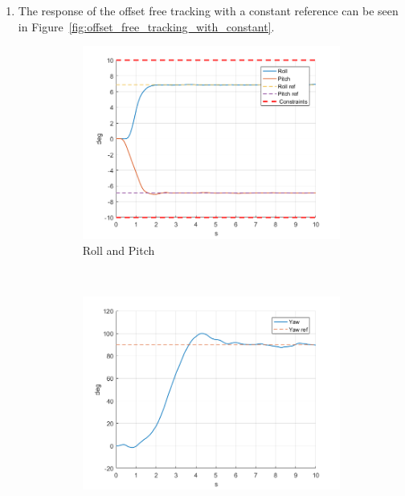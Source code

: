 \documentclass[11pt]{article}
\begin{document}
\begin{enumerate}
	\item The response of the offset free tracking with a constant reference can be
    seen in Figure~\ref{fig:offset_free_tracking_with_constant}.
    \begin{figure}[ht]
        \centering
        \begin{subfigure}[c]{0.3\linewidth}
            \centering
            \includegraphics[width=\linewidth]{Plots_09_OffsetFreeTracking_Constant/01}
            \caption{Roll and Pitch}
        \end{subfigure}
        ~
        \begin{subfigure}[c]{0.3\linewidth}
            \centering
            \includegraphics[width=\linewidth]{Plots_09_OffsetFreeTracking_Constant/02}

\end{subfigure}
\end{figure}
\end{enumerate}
\end{document}
